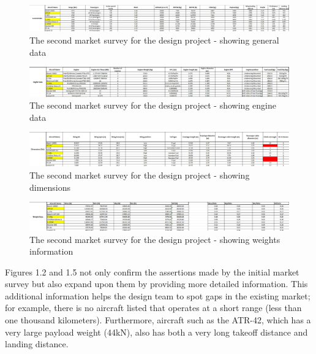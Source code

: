 \documentclass[stu, a4paper, 12pt, floatsintext]{apa7}
\numberwithin{figure}{section}
\numberwithin{table}{section}
\numberwithin{equation}{section}
\begin{document}
\begin{figure}[H]
    \caption{The second market survey for the design project - showing general data}
    \label{fig:market_survey_detailed_1}
    \centering
    \includegraphics[width=1.1\textwidth]{pictures/market_survey_detailed_1.jpg}
\end{figure}
\begin{figure}[H]
    \caption{The second market survey for the design project - showing engine data}
    \label{fig:market_survey_detailed_2}
    \centering
    \includegraphics[width=1.1\textwidth]{pictures/market_survey_detailed_2.jpg}
\end{figure}
\begin{figure}[H]
    \caption{The second market survey for the design project - showing dimensions}
    \label{fig:market_survey_detailed_3}
    \centering
    \includegraphics[width=1.1\textwidth]{pictures/market_survey_detailed_3.jpg}
\end{figure}
\begin{figure}[H]
    \caption{The second market survey for the design project - showing weights information}
    \label{fig:market_survey_detailed_4}
    \centering
    \includegraphics[width=1.1\textwidth]{pictures/market_survey_detailed_4.jpg}
\end{figure}

Figures 1.2 and 1.5 not only confirm the assertions made by the initial market survey but also expand upon them by providing more detailed information. This additional information helps the design team to spot gaps in the existing market; for example, there is no aircraft listed that operates at a short range (less than one thousand kilometers). Furthermore, aircraft such as the ATR-42, which has a very large payload weight (44kN), also has both a very long takeoff distance and landing distance.
\end{document}
